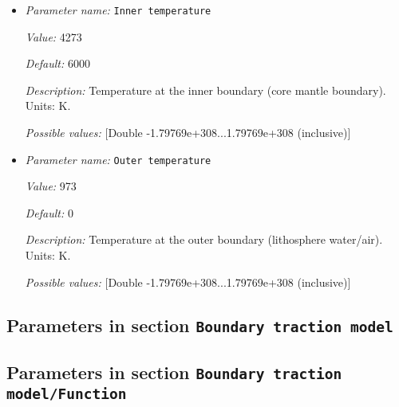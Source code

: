 \begin{itemize}
\item {\it Parameter name:} {\tt Inner temperature}
\label{parameters:Boundary temperature model/Spherical constant/Inner temperature}


{\it Value:} 4273


{\it Default:} 6000


{\it Description:} Temperature at the inner boundary (core mantle boundary). Units: K.


{\it Possible values:} [Double -1.79769e+308...1.79769e+308 (inclusive)]
\item {\it Parameter name:} {\tt Outer temperature}
\label{parameters:Boundary temperature model/Spherical constant/Outer temperature}


{\it Value:} 973


{\it Default:} 0


{\it Description:} Temperature at the outer boundary (lithosphere water/air). Units: K.


{\it Possible values:} [Double -1.79769e+308...1.79769e+308 (inclusive)]
\end{itemize}

\subsection{Parameters in section \tt Boundary traction model}
\label{parameters:Boundary_20traction_20model}


\subsection{Parameters in section \tt Boundary traction model/Function}
\label{parameters:Boundary_20traction_20model/Function}

